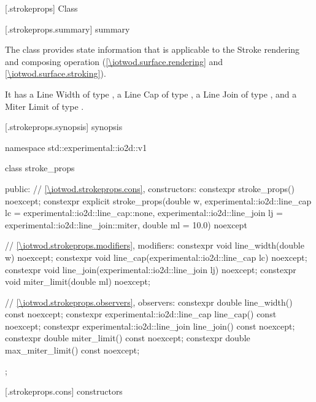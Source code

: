 
 [\iotwod.strokeprops] {Class }

 [\iotwod.strokeprops.summary] { summary}

\pnum
The  class provides state information that is applicable to the Stroke rendering and composing operation (\ref{\iotwod.surface.rendering} and \ref{\iotwod.surface.stroking}).

\pnum
It has a Line Width of type , a Line Cap of type , a Line Join of type , and a Miter Limit of type .

%
 [\iotwod.strokeprops.synopsis] { synopsis}

\begin{codeblock}
namespace std::experimental::io2d::v1 {
  class stroke_props {
  public:
    // \ref{\iotwod.strokeprops.cons}, constructors:
    constexpr stroke_props() noexcept;
    constexpr explicit stroke_props(double w,
      experimental::io2d::line_cap lc = experimental::io2d::line_cap::none,
      experimental::io2d::line_join lj = experimental::io2d::line_join::miter,
      double ml = 10.0) noexcept    

    // \ref{\iotwod.strokeprops.modifiers}, modifiers:
    constexpr void line_width(double w) noexcept;
    constexpr void line_cap(experimental::io2d::line_cap lc) noexcept;
    constexpr void line_join(experimental::io2d::line_join lj) noexcept;
    constexpr void miter_limit(double ml) noexcept;
    
    // \ref{\iotwod.strokeprops.observers}, observers:
    constexpr double line_width() const noexcept;
    constexpr experimental::io2d::line_cap line_cap() const noexcept;
    constexpr experimental::io2d::line_join line_join() const noexcept;
    constexpr double miter_limit() const noexcept;
    constexpr double max_miter_limit() const noexcept;
  };
}
\end{codeblock}

 [\iotwod.strokeprops.cons] { constructors}

